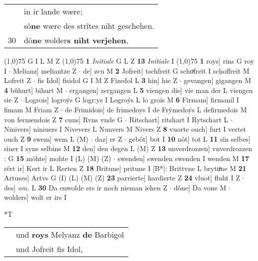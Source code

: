 \documentclass[8pt,a4paper,notitlepage]{article}
\begin{document}
\begin{table}[ht]
\begin{minipage}[t]{0.5\linewidth}
\begin{tabular}{rl}
 & in ir lande wære;\\ 
 & sô\textbf{ne} wære des strîtes niht geschehen.\\ 
30 & dô\textbf{ne} wolder\textbf{s niht} \textbf{verjehen},\\ 
\end{tabular}
\scriptsize
\line(1,0){75} \newline
G I L M Z \newline
\line(1,0){75} \newline
\textbf{1} \textit{Initiale} G L Z  \textbf{13} \textit{Initiale} I  \newline
\line(1,0){75} \newline
\textbf{1} roys] rins G roy I  $\cdot$ Melianz] meliantze Z  $\cdot$ de] zcu M \textbf{2} Jofreit] tschfreit G schoͮfreit I schoffreit M Lofreit Z  $\cdot$ fis Idol] fisidol G I M Z Fizedol L \textbf{3} hin] hie Z  $\cdot$ gevangen] gigangen M \textbf{4} bûhurt] bihurt M  $\cdot$ ergangen] zergangen L \textbf{5} viengen die] vie man der L viengen sie Z  $\cdot$ Logrois] logroẏs G logr:ys I Logroýs L lo grois M \textbf{6} Firmam] firmanil I fimam M Friam Z  $\cdot$ de Frimidois] de frimedoys I de Frýmedoýs L defirmedois M von fermendois Z \textbf{7} cuns] Rvns vnde G  $\cdot$ Ritschart] ritshart I Rytschart L  $\cdot$ Ninivers] niniuers I Nivevers L Nunvers M Nivers Z \textbf{8} vuorte ouch] furt I vertet ouch Z \textbf{9} swem] wem L (M)  $\cdot$ daz] er Z  $\cdot$ gebôt] bot I \textbf{10} nôt] tot L \textbf{11} sîn selbes] siner I syns selbins M \textbf{12} den] den degen L (M) Z \textbf{13} unverdrozzen] vnverdrozzen : G \textbf{15} möhte] mohte I (L) (M) (Z)  $\cdot$ swenden] swenden swenden I wenden M \textbf{17} rêrt ir] Kert ir L Rerten Z \textbf{18} Britune] pritune I [B*]: Brittvne L brytuͯne M \textbf{21} Artuses] Artvs G (I) (L) (M) (Z) \textbf{23} parrierte] hardierte Z \textbf{24} vluot] fluht I Z  $\cdot$ des] \textit{om.} L \textbf{30} Da enwolde ers ir noch nieman iehen Z  $\cdot$ dône] Da vone M  $\cdot$ wolders] wolt er irs I \newline
\end{minipage}
\hspace{0.5cm}
\begin{minipage}[t]{0.5\linewidth}
\small
\begin{center}*T
\end{center}
\begin{tabular}{rl}
 & und \textbf{roys} Melyanz \textbf{de} Barbigol\\ 
 & und Jofreit fis Idol,\\ 

\end{tabular}
\end{minipage}
\end{table}
\end{document}
